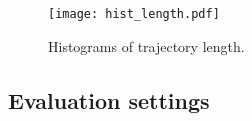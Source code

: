 \begin{figure}[t]
	\centering
	\texttt{[image: hist\_length.pdf]}
	\caption{Histograms of trajectory length.}
	\label{fig:hist_length}
\end{figure}








\subsection{Evaluation settings}
\label{ssec:methods}

